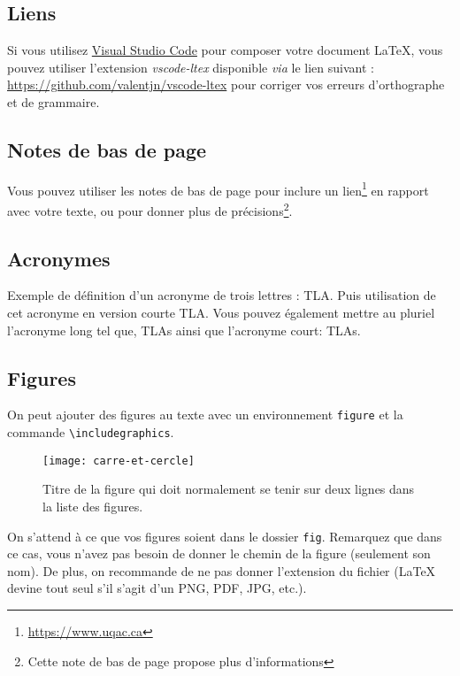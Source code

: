 \subsection{Liens}

Si vous utilisez \href{https://code.visualstudio.com/}{Visual Studio Code} pour composer votre document \LaTeX{}, vous pouvez utiliser l'extension \textit{vscode-ltex} disponible \textit{via} le lien suivant : \url{https://github.com/valentjn/vscode-ltex} pour corriger vos erreurs d'orthographe et de grammaire.

\subsection{Notes de bas de page}

Vous pouvez utiliser les notes de bas de page pour inclure un lien\footnote{\url{https://www.uqac.ca}} en rapport avec votre texte, ou pour donner plus de précisions\footnote{Cette note de bas de page propose plus d'informations}.

\subsection{Acronymes}

Exemple de définition d'un acronyme de trois lettres : \ac{TLA}. Puis utilisation de cet acronyme en version courte \acs{TLA}. Vous pouvez également mettre au pluriel l'acronyme long tel que, \aclp{TLA} ainsi que l'acronyme court: \acsp{TLA}.

\subsection{Figures}

On peut ajouter des figures au texte avec un environnement \verb+figure+ et la commande \verb+\includegraphics+.

\begin{figure} %
 \centering
 \texttt{[image: carre-et-cercle]}
 \caption{Titre de la figure qui doit normalement se tenir sur deux lignes dans la liste des figures.}
 \label{fig:figure_long}
\end{figure}

On s'attend à ce que vos figures soient dans le dossier \verb+fig+. Remarquez que dans ce cas, vous n'avez pas besoin de donner le chemin de la figure (seulement son nom). De plus, on recommande de ne pas donner l'extension du fichier (\LaTeX{} devine tout seul s'il s'agit d'un PNG, PDF, JPG, etc.).

